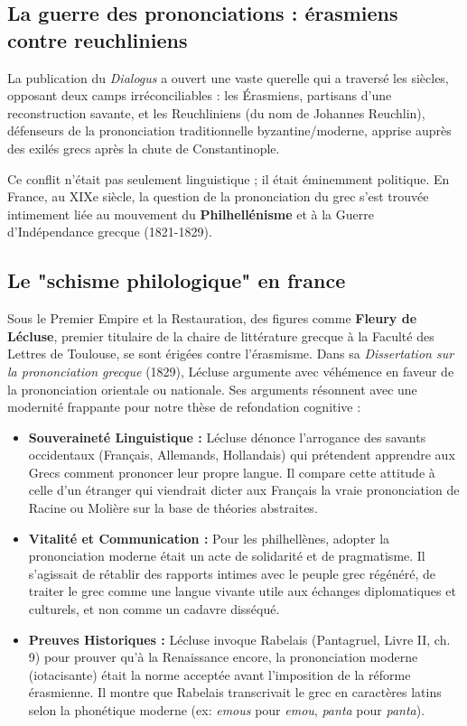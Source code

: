 \subsection{La guerre des prononciations : érasmiens contre reuchliniens}

La publication du \textit{Dialogus} a ouvert une \og vaste querelle\fg{} qui a traversé les siècles,
opposant deux camps irréconciliables : les \og Érasmiens\fg{}, partisans d'une reconstruction
savante, et les \og Reuchliniens\fg{} (du nom de Johannes Reuchlin), défenseurs de la prononciation
traditionnelle byzantine/moderne, apprise auprès des exilés grecs après la chute de
Constantinople.\cite{ref6}

Ce conflit n'était pas seulement linguistique ; il était éminemment politique. En France, au XIXe
siècle, la question de la prononciation du grec s'est trouvée intimement liée au mouvement du
\textbf{Philhellénisme} et à la Guerre d'Indépendance grecque (1821-1829).\cite{ref3}



\subsection{Le "schisme philologique" en france}

Sous le Premier Empire et la Restauration, des figures comme \textbf{Fleury de Lécluse}, premier
titulaire de la chaire de littérature grecque à la Faculté des Lettres de Toulouse, se sont érigées
contre l'érasmisme. Dans sa \textit{Dissertation sur la prononciation grecque} (1829), Lécluse
argumente avec véhémence en faveur de la prononciation \og orientale\fg{} ou nationale.\cite{ref3}
Ses arguments résonnent avec une modernité frappante pour notre thèse de refondation cognitive :

\begin{itemize}\item \textbf{Souveraineté Linguistique :} Lécluse dénonce l'arrogance des savants occidentaux (Français, Allemands, Hollandais) qui prétendent apprendre aux Grecs comment prononcer leur propre langue. Il compare cette attitude à celle d'un étranger qui viendrait dicter aux Français la \og vraie\fg{} prononciation de Racine ou Molière sur la base de théories abstraites.\cite{ref3}\item \textbf{Vitalité et Communication :} Pour les philhellènes, adopter la prononciation moderne était un acte de solidarité et de pragmatisme. Il s'agissait de rétablir des \og rapports intimes\fg{} avec le peuple grec régénéré, de traiter le grec comme une langue vivante utile aux échanges diplomatiques et culturels, et non comme un cadavre disséqué.\cite{ref3}\item \textbf{Preuves Historiques :} Lécluse invoque Rabelais (Pantagruel, Livre II, ch. 9) pour prouver qu'à la Renaissance encore, la prononciation \og moderne\fg{} (iotacisante) était la norme acceptée avant l'imposition de la réforme érasmienne. Il montre que Rabelais transcrivait le grec en caractères latins selon la phonétique moderne (ex: \textit{emous} pour \textit{emou}, \textit{panta} pour \textit{panta}).\cite{ref8}\end{itemize}

